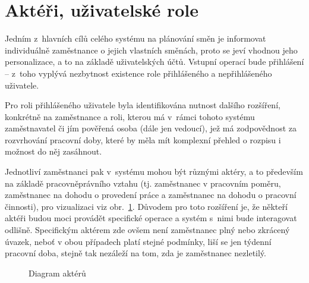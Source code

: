\documentclass[twoside]{ctuthesis}
\begin{document}
\section{Aktéři, uživatelské role}
Jedním z~hlavních cílů celého systému na plánování směn je informovat individuálně zaměstnance o jejich vlastních směnách, proto se jeví vhodnou jeho personalizace, a to na základě uživatelských účtů. Vstupní operací bude přihlášení -- z~toho vyplývá nezbytnost existence role přihlášeného a nepřihlášeného uživatele.

Pro roli přihlášeného uživatele byla identifikována nutnost dalšího rozšíření, konkrétně na zaměstnance a roli, kterou má v~rámci tohoto systému za\-měst\-na\-va\-tel či jím pověřená osoba (dále jen vedoucí), jež má zodpovědnost za rozvrhování pracovní doby, které by měla mít komplexní přehled o rozpisu i možnost do něj zasáhnout.

Jednotliví zaměstnanci pak v~systému mohou být různými aktéry, a to především na základě pracovněprávního vztahu (tj. zaměstnanec v pracovním poměru, zaměstnanec na dohodu o provedení práce a zaměstnanec na dohodu o pracovní činnosti), pro vizualizaci viz obr.~\ref{fig:userroles}. Důvodem pro toto rozšíření je, že někteří aktéři budou moci provádět specifické operace a systém s~nimi bude interagovat odlišně. Specifickým aktérem zde ovšem není zaměstnanec plný nebo zkrácený úvazek, neboť v obou případech platí stejné podmínky, liší se jen týdenní pracovní doba, stejně tak nezáleží na tom, zda je zaměstnanec nezletilý.

\begin{figure}[h]
	
	\caption{Diagram aktérů}
	\label{fig:userroles}
\end{figure}
\end{document}
